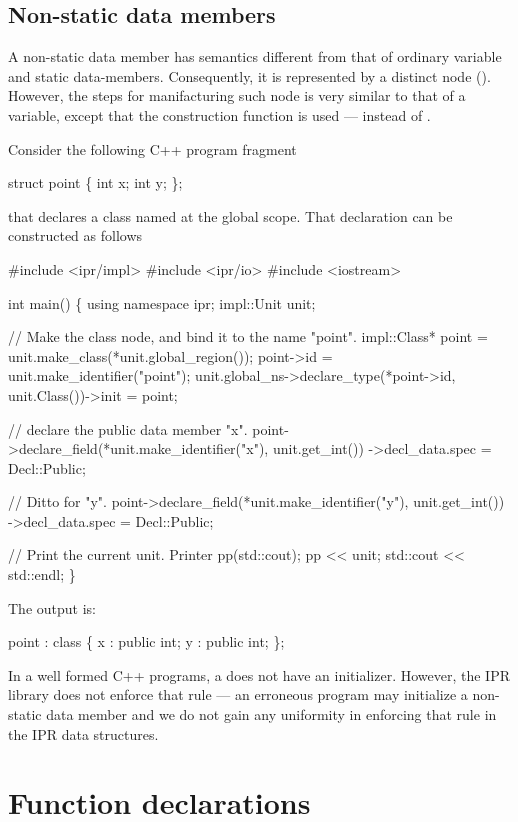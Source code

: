 \documentclass[a4paper,12pt]{article}
\begin{document}
\subsection{Non-static data members}
\label{sec:named.data.nonstatic-member}

A non-static data member has semantics different from that of ordinary 
variable and static data-members.  Consequently, it is represented by a
distinct node ().  However, the steps for manifacturing such node
is very similar to that of a variable, except that the construction function 
 is used --- instead of .

Consider the following C++ program fragment
\begin{Program}
  struct point \{
    int x;
    int y;
  \};
\end{Program}
that declares a class named  at the global scope.  That
declaration can be constructed as follows
\begin{Program}
#include <ipr/impl>
#include <ipr/io>
#include <iostream>

int main()
\{
   using namespace ipr;
   impl::Unit unit;

   // Make the class node, and bind it to the name "point".
   impl::Class* point = unit.make_class(*unit.global_region());
   point->id = unit.make_identifier("point");
   unit.global_ns->declare_type(*point->id, unit.Class())->init = point;

   // declare the public data member "x".
   point->declare_field(*unit.make_identifier("x"), unit.get_int())
      ->decl_data.spec = Decl::Public;

   // Ditto for "y".
   point->declare_field(*unit.make_identifier("y"), unit.get_int())
      ->decl_data.spec = Decl::Public;

   // Print the current unit.
   Printer pp(std::cout);
   pp << unit;
   std::cout << std::endl;
\}
\end{Program}

The output is:
\begin{Program}
point : class \{
    x : public int;
    y : public int;
\};
\end{Program}
In a well formed C++ programs, a  does not have an initializer.
However, the IPR library does not enforce that rule --- an erroneous program
may initialize a non-static data member and we do not gain any uniformity in
enforcing that rule in the IPR data structures. 

\section{Function declarations}
\label{sec:fun-decl}
\end{document}
